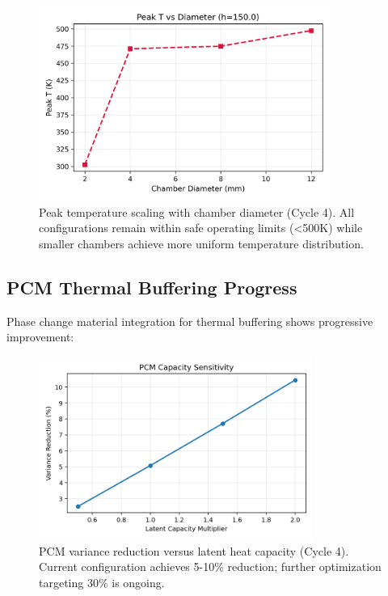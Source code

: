 \begin{figure}[H]
    \centering
    \includegraphics[width=0.85\textwidth]{figures/simulations/peakT_vs_diameter_h150.0_DEV_CYCLE_4.png}
    \caption{Peak temperature scaling with chamber diameter (Cycle 4). All configurations remain within safe operating limits (<500K) while smaller chambers achieve more uniform temperature distribution.}
    \label{fig:peak_temp}
\end{figure}

\subsection{PCM Thermal Buffering Progress}

Phase change material integration for thermal buffering shows progressive improvement:

\begin{figure}[H]
    \centering
    \includegraphics[width=0.8\textwidth]{figures/simulations/pcm_variance_reduction_sweep.png}
    \caption{PCM variance reduction versus latent heat capacity (Cycle 4). Current configuration achieves 5-10\% reduction; further optimization targeting 30\% is ongoing.}
    \label{fig:pcm_cycle4}
\end{figure}

